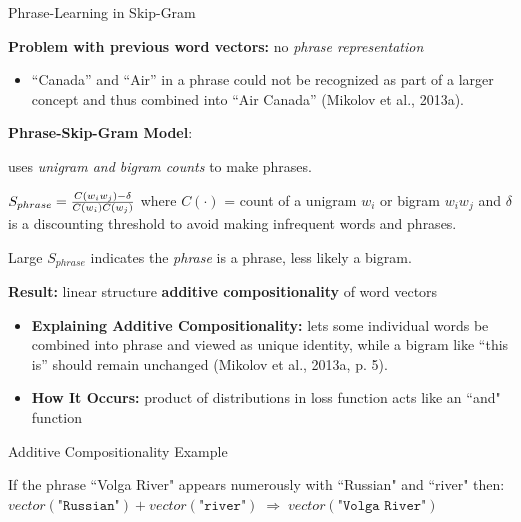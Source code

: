 \begin{frame}{Phrase-Learning in Skip-Gram}

    \begin{itemizeSpaced}{7pt}
    
        \item \textbf{Problem with previous word vectors:} no \emph{phrase representation}
        \begin{itemize}
            \item “Canada” and “Air” in a phrase could not be recognized as part of a larger concept and thus combined into “Air Canada” (Mikolov et al., 2013a).
        \end{itemize}
        
        \item \textbf{Phrase-Skip-Gram Model}:
        \begin{itemizeSpaced}{2pt}
            \item uses \emph{unigram and bigram counts} to make phrases.
            
            \item ${\large S_{phrase} = \frac{C(w_i w_j) - \delta} {C(w_i)C(w_j)} }$ where $C(\cdot)$ = count of a unigram $w_i$ or bigram $w_i w_j$ and $\delta$ is a discounting threshold to avoid making infrequent words and phrases.
            
            \item Large $S_{phrase}$ indicates the \emph{phrase} is a phrase, less likely a bigram. 
        \end{itemizeSpaced}
        
        
        \item \textbf{Result: } linear structure \textbf{additive compositionality} of word vectors 
        
        \begin{itemize}
            \item \textbf{Explaining Additive Compositionality: }lets some individual words be combined into phrase and viewed as unique identity, while a bigram like “this is” should remain unchanged (Mikolov et al., 2013a, p. 5).
            
            \item \textbf{How It Occurs: } product of distributions in loss function acts like an ``and" function
        \end{itemize} 
        
        \begin{exampleBlock}{Additive Compositionality Example}
        
        If the phrase ``Volga River" appears numerously with ``Russian" and ``river" then: $vector(\texttt{"Russian"}) \! + \! vector(\texttt{"river"}) \; \Rightarrow \; vector(\texttt{"Volga River"})$
        
        \end{exampleBlock}
        
        
    \end{itemizeSpaced}
    
\end{frame}